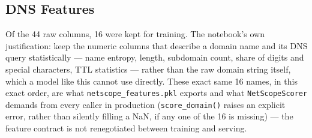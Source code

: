 \subsection*{DNS Features}
Of the 44 raw columns, 16 were kept for training. The notebook's own
justification: keep the numeric columns that describe a domain name and its
DNS query statistically --- name entropy, length, subdomain count, share of
digits and special characters, TTL statistics --- rather than the raw
domain string itself, which a model like this cannot use directly. These
exact same 16 names, in this exact order, are what
\texttt{netscope\_features.pkl} exports and what \texttt{NetScopeScorer}
demands from every caller in production (\texttt{score\_domain()} raises an
explicit error, rather than silently filling a NaN, if any one of the 16 is
missing) --- the feature contract is not renegotiated between training and
serving.


